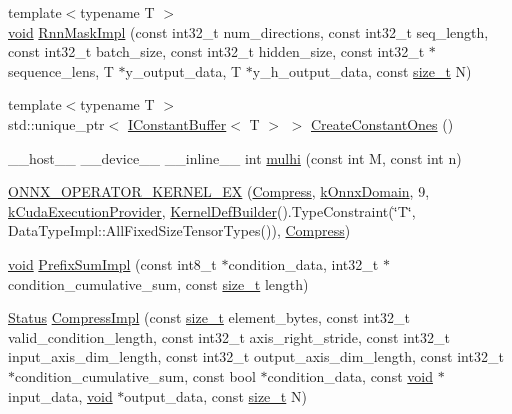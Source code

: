 \begin{DoxyCompactItemize}
{\footnotesize template$<$typename T $>$ }\\\mbox{\hyperlink{mlasi_8h_a88f941d423cb2a819b70a1358982b1a6}{void}} \mbox{\hyperlink{namespaceonnxruntime_1_1cuda_a26415486136df0da0e096efc908ab00e}{Rnn\+Mask\+Impl}} (const int32\+\_\+t num\+\_\+directions, const int32\+\_\+t seq\+\_\+length, const int32\+\_\+t batch\+\_\+size, const int32\+\_\+t hidden\+\_\+size, const int32\+\_\+t $\ast$sequence\+\_\+lens, T $\ast$y\+\_\+output\+\_\+data, T $\ast$y\+\_\+h\+\_\+output\+\_\+data, const \mbox{\hyperlink{mlasi_8h_a503efbc1c6e50825320ad909366b78ab}{size\+\_\+t}} N)
\item 
{\footnotesize template$<$typename T $>$ }\\std\+::unique\+\_\+ptr$<$ \mbox{\hyperlink{classonnxruntime_1_1cuda_1_1IConstantBuffer}{I\+Constant\+Buffer}}$<$ T $>$ $>$ \mbox{\hyperlink{namespaceonnxruntime_1_1cuda_a855114def2d3cfc9e8f0ff2d267ff782}{Create\+Constant\+Ones}} ()
\item 
\+\_\+\+\_\+host\+\_\+\+\_\+ \+\_\+\+\_\+device\+\_\+\+\_\+ \+\_\+\+\_\+inline\+\_\+\+\_\+ int \mbox{\hyperlink{namespaceonnxruntime_1_1cuda_a22b8733c4c436accb3315fd80dea8932}{mulhi}} (const int M, const int n)
\item 
\mbox{\hyperlink{namespaceonnxruntime_1_1cuda_a701faf5b96d3e29766ae68c9c03747ec}{O\+N\+N\+X\+\_\+\+O\+P\+E\+R\+A\+T\+O\+R\+\_\+\+K\+E\+R\+N\+E\+L\+\_\+\+EX}} (\mbox{\hyperlink{classonnxruntime_1_1cuda_1_1Compress}{Compress}}, \mbox{\hyperlink{namespaceonnxruntime_ac0e7c0c106a2c9e9594560a3ab289fa0}{k\+Onnx\+Domain}}, 9, \mbox{\hyperlink{namespaceonnxruntime_a73ebc64887ddd1968e3cef47ffefe35b}{k\+Cuda\+Execution\+Provider}}, \mbox{\hyperlink{classonnxruntime_1_1KernelDefBuilder}{Kernel\+Def\+Builder}}().Type\+Constraint(\char`\"{}T\char`\"{}, Data\+Type\+Impl\+::\+All\+Fixed\+Size\+Tensor\+Types()), \mbox{\hyperlink{classonnxruntime_1_1cuda_1_1Compress}{Compress}})
\item 
\mbox{\hyperlink{mlasi_8h_a88f941d423cb2a819b70a1358982b1a6}{void}} \mbox{\hyperlink{namespaceonnxruntime_1_1cuda_a6b52519ba407035907bc4ee158ab8aaf}{Prefix\+Sum\+Impl}} (const int8\+\_\+t $\ast$condition\+\_\+data, int32\+\_\+t $\ast$condition\+\_\+cumulative\+\_\+sum, const \mbox{\hyperlink{mlasi_8h_a503efbc1c6e50825320ad909366b78ab}{size\+\_\+t}} length)
\item 
\mbox{\hyperlink{classonnxruntime_1_1common_1_1Status}{Status}} \mbox{\hyperlink{namespaceonnxruntime_1_1cuda_ade6fe15dd248c66b252a7cf9c2b0744d}{Compress\+Impl}} (const \mbox{\hyperlink{mlasi_8h_a503efbc1c6e50825320ad909366b78ab}{size\+\_\+t}} element\+\_\+bytes, const int32\+\_\+t valid\+\_\+condition\+\_\+length, const int32\+\_\+t axis\+\_\+right\+\_\+stride, const int32\+\_\+t input\+\_\+axis\+\_\+dim\+\_\+length, const int32\+\_\+t output\+\_\+axis\+\_\+dim\+\_\+length, const int32\+\_\+t $\ast$condition\+\_\+cumulative\+\_\+sum, const bool $\ast$condition\+\_\+data, const \mbox{\hyperlink{mlasi_8h_a88f941d423cb2a819b70a1358982b1a6}{void}} $\ast$input\+\_\+data, \mbox{\hyperlink{mlasi_8h_a88f941d423cb2a819b70a1358982b1a6}{void}} $\ast$output\+\_\+data, const \mbox{\hyperlink{mlasi_8h_a503efbc1c6e50825320ad909366b78ab}{size\+\_\+t}} N)

\end{DoxyCompactItemize}
